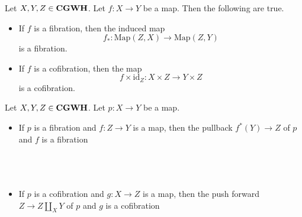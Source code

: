 \documentclass[a4paper]{article}
\begin{document}
\begin{prp}{}{} Let $X,Y,Z\in\bold{CGWH}$. Let $f:X\to Y$ be a map. Then the following are true. 
\begin{itemize}
\item If $f$ is a fibration, then the induced map $$f_\ast:\text{Map}(Z,X)\to\text{Map}(Z,Y)$$ is a fibration. 
\item If $f$ is a cofibration, then the map $$f\times\text{id}_Z:X\times Z\to Y\times Z$$ is a cofibration. 
\end{itemize}
\end{prp}

\begin{prp}{}{} Let $X,Y,Z\in\bold{CGWH}$. Let $p:X\to Y$ be a map. 
\begin{itemize}
\item If $p$ is a fibration and $f:Z\to Y$ is a map, then the pullback $f^\ast(Y)\to Z$ of $p$ and $f$ is a fibration \\~\\
\\~\\
\item If $p$ is a cofibration and $g:X\to Z$ is a map, then the push forward $Z\to Z\coprod_XY$ of $p$ and $g$ is a cofibration \\~\\
\\~\\
\end{itemize}
\end{prp}
\end{document}
